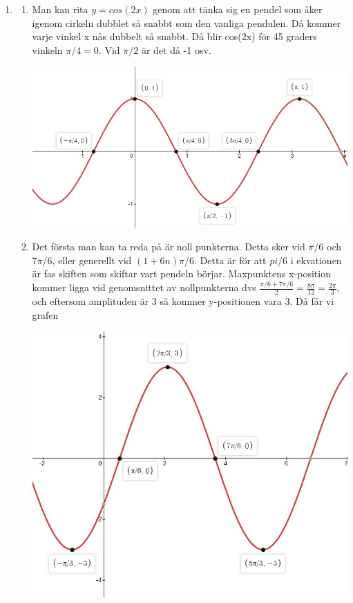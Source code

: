 \documentclass[a4paper,12pt]{article}
\begin{document}
\begin{enumerate}
    \item
          \begin{enumerate}
              \item Man kan rita $y=cos(2x)$ genom att tänka sig en pendel som åker igenom cirkeln dubblet
                    så snabbt som den vanliga pendulen. Då kommer varje vinkel x nås dubbelt så snabbt. Då blir
                    cos(2x) för 45 graders vinkeln $\pi/4=0$. Vid $\pi/2$ är det då -1 osv.

                    \includegraphics[scale=0.5]{Figur2.png}

              \item Det första man kan ta reda på är noll punkterna. Detta sker vid $\pi/6$ och $7\pi/6$,
                    eller generellt vid $(1+6n)\pi/6$.
                    Detta är för att $pi/6$ i ekvationen är fas skiften som skiftar vart pendeln börjar.
                    Maxpunktens x-position kommer ligga vid genomsnittet
                    av nollpunkterna dvs $\frac{\pi/6+7\pi/6}{2}=\frac{8\pi}{12}=\frac{2\pi}{3}$, och eftersom
                    amplituden är 3 så kommer y-positionen vara 3. Då får vi grafen

                    \includegraphics[scale=0.5]{Figur3.png}
          \end{enumerate}


\end{enumerate}
\end{document}
